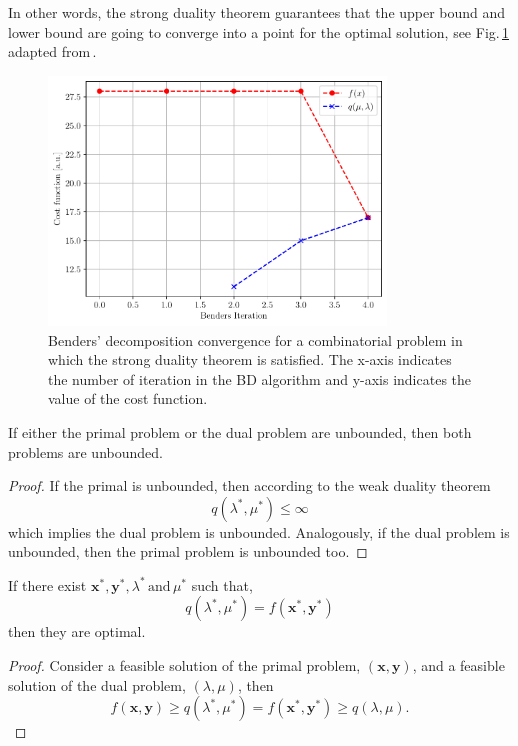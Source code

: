 In other words, the strong duality theorem guarantees that the upper bound and lower bound are going to converge into a point for the optimal solution, see Fig.\,\ref{fig:BD_Convergence} adapted from\,\cite{Zhao2021HybridProgramming}.
\begin{figure}[H]
\centering
\includegraphics[width=0.8\textwidth]{Figures/BD_Convergence.pdf} 
\caption{Benders' decomposition convergence for a combinatorial problem in which the strong duality theorem is satisfied. The x-axis indicates the number of iteration in the BD algorithm and y-axis indicates the value of the cost function.}
\label{fig:BD_Convergence}
\end{figure}
\begin{corollary}{}{}
If either the primal problem or the dual problem are unbounded, then both problems are unbounded.
\end{corollary}
\begin{proof}
If the primal is unbounded, then according to the weak duality theorem
\begin{equation}
    q(\lambda^{*}, \mu^{*}) \leq \infty
\end{equation}
which implies the dual problem is unbounded. Analogously, if the dual problem is unbounded, then the primal problem is unbounded too.
\end{proof}
\begin{corollary}{}{}
If there exist $\mathbf{x}^{*}, \mathbf{y}^{*},\lambda^{*}\,\textrm{and}\, \mu^{*}$ such that,
\begin{equation}
    q(\lambda^{*}, \mu^{*}) = f(\mathbf{x}^{*}, \mathbf{y}^{*})
\end{equation}
then they are optimal.
\end{corollary}
\begin{proof}
Consider a feasible solution of the primal problem, $(\mathbf{x}, \mathbf{y})$, and a feasible solution of the dual problem, $(\lambda, \mu)$, then
\begin{equation}
    f(\mathbf{x}, \mathbf{y}) \geq q(\lambda^{*}, \mu^{*}) = f(\mathbf{x}^{*}, \mathbf{y}^{*}) \geq q(\lambda, \mu).
\end{equation}
\end{proof}
